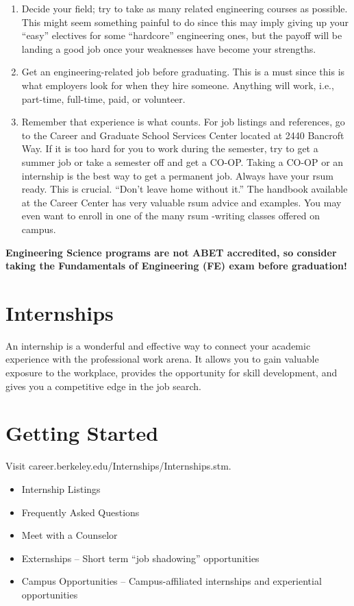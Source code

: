 \begin{enumerate}
  \item Decide your field; try to take as many related engineering courses as possible. This might seem something painful to do since this may imply giving up your “easy” electives for some “hardcore” engineering ones, but the payoff will be landing a good job once your weaknesses have become your strengths.
  \item Get an engineering-related job before graduating. This is a must since this is what employers look for when they hire someone. Anything will work, i.e., part-time, full-time, paid, or volunteer.
  \item Remember that experience is what counts. For job listings and references, go to the Career and Graduate School Services Center located at 2440 Bancroft Way. If it is too hard for you to work during the semester, try to get a summer job or take a semester off and get a CO-OP. Taking a CO-OP or an internship is the best way to get a permanent job. Always have your rsum ready. This is crucial. “Don’t
leave home without it.” The handbook available at the Career Center has very valuable rsum advice and examples. You may even want to enroll in one of the many rsum -writing classes offered on campus.
\end{enumerate}

\textbf{Engineering Science programs are not ABET accredited, so consider taking the Fundamentals of Engineering (FE) exam before graduation!}

\section*{Internships}

An internship is a wonderful and effective way to connect your academic experience with the professional work arena. It allows you to gain valuable exposure to the workplace, provides the opportunity for skill development, and gives you a competitive edge in the job search.

\section*{Getting Started}

Visit {\selectfont career.berkeley.edu/Internships/Internships.stm}.
\begin{itemize}
  \item Internship Listings
  \item Frequently Asked Questions
  \item Meet with a Counselor
  \item Externships – Short term “job shadowing” opportunities
  \item Campus Opportunities – Campus-affiliated internships and experiential opportunities
\end{itemize}


